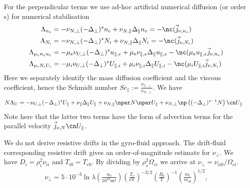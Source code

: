  For the perpendicular terms we use ad-hoc artificial numerical diffusion (or
 order s) for numerical stabilisation %
\begin{align}
\label{eq:perpdiffNU}
\Lambda_{n_e} &=  -\nu_{N,\perp}(-\Delta_\perp)^s n_e + \nu_{N,\parallel}\Delta_\parallel n_e = -\nc ( \vec j_{\nu,n_e}) \\
\Lambda_{N_i} &=  -\nu_{N,\perp}(-\Delta_\perp)^s N_i + \nu_{N,\parallel}\Delta_\parallel N_i= -\nc ( \vec j_{\nu,N_i}) \\
\Lambda_{\mu_e n_e u_e} &=  -\mu_e\nu_{U,\perp}(-\Delta_\perp)^s u_{\parallel,e} + \mu_e \nu_{\parallel,e} \Delta_\parallel u_{\parallel,e}  - \nc ( \mu_e u_{\parallel,e} \vec j_{\nu,n_e})\\
\Lambda_{\mu_i N_i U_i} &=  -\mu_i\nu_{U,\perp}(-\Delta_\perp)^s U_{\parallel,i} + \mu_i \nu_{\parallel,i} \Delta_\parallel U_{\parallel,i}  - \nc ( \mu_i U_{\parallel,i} \vec j_{\nu,N_i})
\end{align}
Here we separately identify the mass diffusion coefficient and the viscous
coefficient, hence the Schmidt number \(\mathit{Sc}_\parallel:=
\frac{\nu_{U,\perp}}{\nu_{N,\perp}}\).
We have
\begin{align}
    N\Lambda_U &=  -\nu_{U,\perp}(-\Delta_\perp)^s U_{\parallel} +  \nu_{\parallel} \Delta_\parallel U_{\parallel}  + \nu_{N,\parallel} \npar N \npar U_{\parallel} + \nu_{N,\perp}\np\left( (-\Delta_\perp)^{s-1}N\right) \cn U_{\parallel}
\end{align}
Note here that the latter two terms have the form of advection terms for the parallel velocity $\vec j_{\nu,N}\cn U_\parallel$.

We do not derive resistive drifts in the gyro-fluid approach.
The drift-fluid corresponding resistive drift gives an order-of-magnitude estimate for $\nu_\perp$.
We have  $D_i = \rho_i^2 \nu_{ii}$ and $T_{i0} = T_{e0}$.
By dividing by $\rho_s^2 \Omega_{ci}$ we arrive at $\nu_\perp = \nu_{ii0}/\Omega_{ci}$.
\begin{align}
\nu_\perp =
5\cdot 10^{-3} \ln \lambda
\left(\frac{n_0}{10^{19}\text{m}^3}\right)
\left(\frac{T_e}{\text{eV}}\right)^{-3/2}
\left(\frac{B_0}{\text{T}}\right)^{-1}
\left(\frac{m_i}{m_H}\right)^{1/2},
\end{align}


